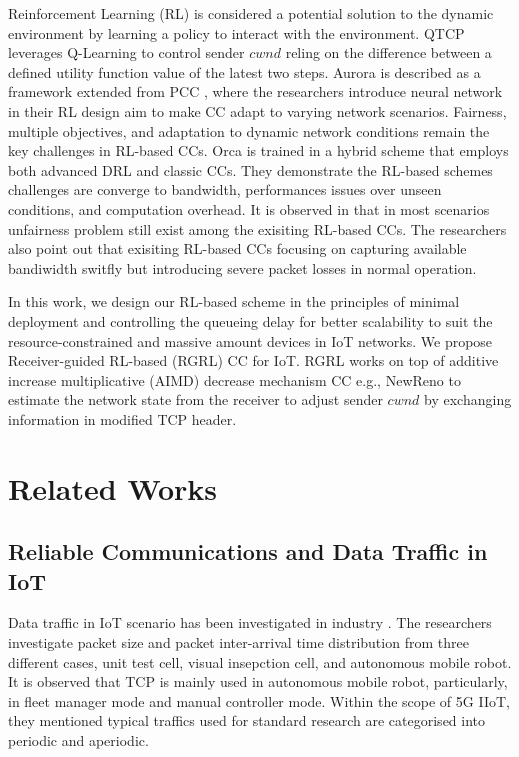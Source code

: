 \documentclass[journal]{IEEEtran}
\begin{document}
Reinforcement Learning (RL) is considered a potential solution to the dynamic environment by learning a policy to interact with the environment.
QTCP \cite{li2018qtcp} leverages Q-Learning to control sender $cwnd$ reling on the difference between a defined utility function value of the latest two steps.
Aurora \cite{jay2019deep} is described as a framework extended from PCC \cite{dong2018pcc}, where the researchers introduce neural network in their RL design aim to make CC adapt to varying network scenarios. Fairness, multiple objectives, and adaptation to dynamic network conditions remain the key challenges in RL-based CCs.
Orca \cite{abbasloo2020classic} is trained in a hybrid scheme that employs both advanced DRL and classic CCs. They demonstrate the RL-based schemes challenges are converge to bandwidth, performances issues over unseen conditions, and computation overhead.
It is observed in \cite{giacomoni2024reinforcement} that in most scenarios unfairness problem still exist among the exisiting RL-based CCs. The researchers also point out that exisiting RL-based CCs focusing on capturing available bandiwidth switfly but introducing severe packet losses in normal operation.

In this work, we design our RL-based scheme in the principles of minimal deployment and controlling the queueing delay for better scalability to suit the resource-constrained and massive amount devices in IoT networks. We propose Receiver-guided RL-based (RGRL) CC for IoT. RGRL works on top of additive increase multiplicative (AIMD) decrease mechanism CC e.g., NewReno to estimate the network state from the receiver to adjust sender $cwnd$ by exchanging information in modified TCP header.

\section{Related Works}
\subsection{Reliable Communications and Data Traffic in IoT}
Data traffic in IoT scenario has been investigated in industry \cite{mogensen2021empirical}. The researchers investigate packet size and packet inter-arrival time distribution from three different cases, unit test cell, visual insepction cell, and autonomous mobile robot. It is observed that TCP is mainly used in autonomous mobile robot, particularly, in fleet manager mode and manual controller mode. Within the scope of 5G IIoT, they mentioned typical traffics used for standard research are categorised into periodic and aperiodic.
\end{document}
